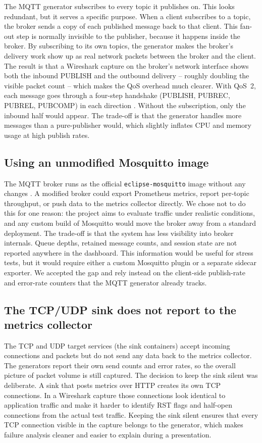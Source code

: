The MQTT generator subscribes to every topic it publishes on. This looks
redundant, but it serves a specific purpose. When a client subscribes to a
topic, the broker sends a copy of each published message back to that client.
This fan-out step is normally invisible to the publisher, because it happens
inside the broker. By subscribing to its own topics, the generator makes the
broker's delivery work show up as real network packets between the broker and
the client. The result is that a Wireshark capture on the broker's network
interface shows both the inbound PUBLISH and the outbound delivery -- roughly
doubling the visible packet count -- which makes the QoS overhead much clearer.
With QoS~2, each message goes through a four-step handshake
(PUBLISH, PUBREC, PUBREL, PUBCOMP) in each direction
\cite{mqtt5}. Without the subscription, only the inbound half would appear.
The trade-off is that the generator handles more messages than a
pure-publisher would, which slightly inflates CPU and memory usage at
high publish rates.

\subsection{Using an unmodified Mosquitto image}

The MQTT broker runs as the official \texttt{eclipse-mosquitto} image
without any changes \cite{mosquitto}. A modified broker could export
Prometheus metrics, report per-topic throughput, or push data to the
metrics collector directly. We chose not to do this for one reason: the
project aims to evaluate traffic under realistic conditions, and any custom
build of Mosquitto would move the broker away from a standard deployment.
The trade-off is that the system has less visibility into broker internals.
Queue depths, retained message counts, and session state are not reported
anywhere in the dashboard. This information would be useful for stress
tests, but it would require either a custom Mosquitto plugin or a separate
sidecar exporter. We accepted the gap and rely instead on the client-side
publish-rate and error-rate counters that the MQTT generator already tracks.

\subsection{The TCP/UDP sink does not report to the metrics collector}

The TCP and UDP target services (the sink containers) accept incoming
connections and packets but do not send any data back to the metrics
collector. The generators report their own send counts and error rates, so
the overall picture of packet volume is still captured. The decision to keep
the sink silent was deliberate. A sink that posts metrics over HTTP creates
its own TCP connections. In a Wireshark capture those connections look
identical to application traffic and make it harder to identify RST flags
and half-open connections from the actual test traffic. Keeping the sink
silent ensures that every TCP connection visible in the capture belongs to
the generator, which makes failure analysis cleaner and easier to explain
during a presentation.

